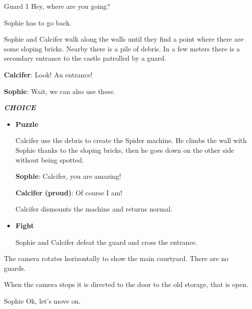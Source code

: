 \begin{screenplay}

\begin{dialogue}{Guard 1}
Hey, where are you going?
\end{dialogue}

Sophie has to go back.

\end{screenplay}
\vspace{1em}


Sophie and Calcifer walk along the walls until they find a point where there are some sloping bricks. Nearby there is a pile of debris.
In a few meters there is a secondary entrance to the castle patrolled by a guard.

\textbf{Calcifer}: Look! An entrance!

\textbf{Sophie}: Wait, we can also use these.

\textit{\textbf{CHOICE}}
\begin{itemize}
  \item \textbf{Puzzle}
  
  Calcifer use the debris to create the Spider machine. He climbs the wall with Sophie thanks to the sloping bricks, then he goes down on the other side without being spotted.
  
  \textbf{Sophie}: Calcifer, you are amazing!
  
  \textbf{Calcifer (proud)}: Of course I am!

  Calcifer dismounts the machine and returns normal.

  \item \textbf{Fight}
    
  Sophie and Calcifer defeat the guard and cross the entrance.
\end{itemize}


\begin{screenplay}

The camera rotates horizontally to show the main courtyard. There are no guards.

When the camera stops it is directed to the door to the old storage, that is open.

\begin{dialogue}{Sophie}
Ok, let's move on.
\end{dialogue}

\end{screenplay}
\vspace{1em}

